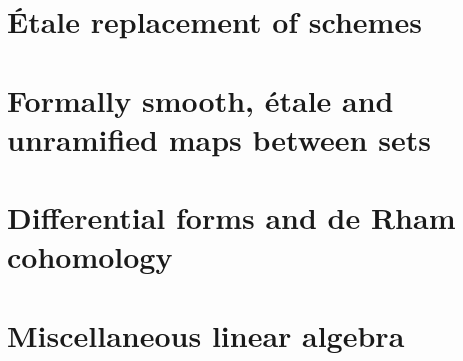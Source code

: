 \documentclass{../util/zariski}
\begin{document}
\section{Étale replacement of schemes}


\section{Formally smooth, étale and unramified maps between sets}


\section{Differential forms and de Rham cohomology}


\section{Miscellaneous linear algebra}


\printindex

\printbibliography
\end{document}
